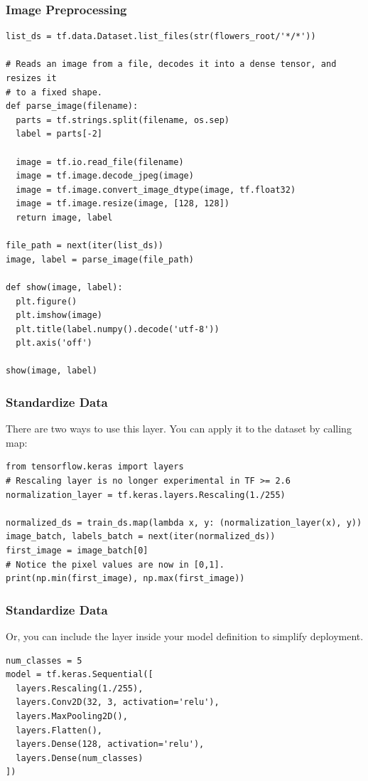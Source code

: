 \begin{frame}[fragile]\frametitle{Image Preprocessing}

\begin{lstlisting}
list_ds = tf.data.Dataset.list_files(str(flowers_root/'*/*'))

# Reads an image from a file, decodes it into a dense tensor, and resizes it
# to a fixed shape.
def parse_image(filename):
  parts = tf.strings.split(filename, os.sep)
  label = parts[-2]

  image = tf.io.read_file(filename)
  image = tf.image.decode_jpeg(image)
  image = tf.image.convert_image_dtype(image, tf.float32)
  image = tf.image.resize(image, [128, 128])
  return image, label
	
file_path = next(iter(list_ds))
image, label = parse_image(file_path)

def show(image, label):
  plt.figure()
  plt.imshow(image)
  plt.title(label.numpy().decode('utf-8'))
  plt.axis('off')

show(image, label)
\end{lstlisting}
\end{frame}

\begin{frame}[fragile]\frametitle{Standardize Data}

There are two ways to use this layer. You can apply it to the dataset by calling map:
\begin{lstlisting}
from tensorflow.keras import layers
# Rescaling layer is no longer experimental in TF >= 2.6
normalization_layer = tf.keras.layers.Rescaling(1./255)

normalized_ds = train_ds.map(lambda x, y: (normalization_layer(x), y))
image_batch, labels_batch = next(iter(normalized_ds))
first_image = image_batch[0]
# Notice the pixel values are now in [0,1].
print(np.min(first_image), np.max(first_image))
\end{lstlisting}


\end{frame}

\begin{frame}[fragile]\frametitle{Standardize Data}

Or, you can include the layer inside your model definition to simplify deployment.

\begin{lstlisting}
num_classes = 5
model = tf.keras.Sequential([
  layers.Rescaling(1./255),
  layers.Conv2D(32, 3, activation='relu'),
  layers.MaxPooling2D(),
  layers.Flatten(),
  layers.Dense(128, activation='relu'),
  layers.Dense(num_classes)
])
\end{lstlisting}

\end{frame}


